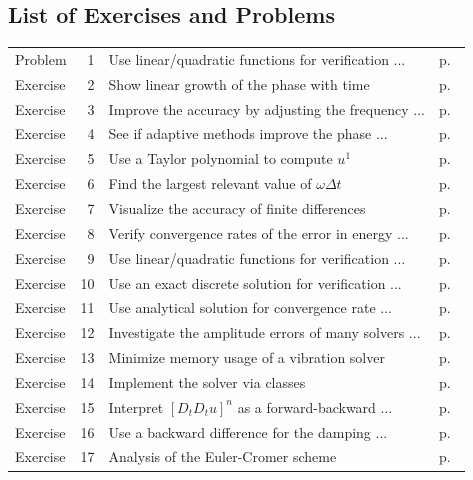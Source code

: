 \documentclass[%
oneside,                 %
final,                   %
10pt]{article}
\begin{document}
\subsection*{List of Exercises and Problems}
\begin{tabular}{lrll}
Problem & 1 & Use linear/quadratic functions for verification ... & p.~\pageref{vib:exer:undamped:verify:linquad} \\
Exercise & 2 & Show linear growth of the phase with time & p.~\pageref{vib:exer:phase:err:growth} \\
Exercise & 3 & Improve the accuracy by adjusting the frequency ... & p.~\pageref{vib:exer:w:adjust} \\
Exercise & 4 & See if adaptive methods improve the phase ... & p.~\pageref{vib:exer:undamped:adaptive} \\
Exercise & 5 & Use a Taylor polynomial to compute $u^1$ & p.~\pageref{vib:exer:step4b:alt} \\
Exercise & 6 & Find the largest relevant value of $\omega\Delta t$ & p.~\pageref{vib:exer:wdt:limit} \\
Exercise & 7 & Visualize the accuracy of finite differences & p.~\pageref{vib:exer:fd:exp:plot} \\
Exercise & 8 & Verify convergence rates of the error in energy ... & p.~\pageref{vib:exer:energy:convrate} \\
Exercise & 9 & Use linear/quadratic functions for verification ... & p.~\pageref{vib:exer:verify:gen:linear} \\
Exercise & 10 & Use an exact discrete solution for verification ... & p.~\pageref{vib:exer:discrete:omega} \\
Exercise & 11 & Use analytical solution for convergence rate ... & p.~\pageref{vib:exer:conv:rate} \\
Exercise & 12 & Investigate the amplitude errors of many solvers ... & p.~\pageref{vib:exer:undamped:odespy} \\
Exercise & 13 & Minimize memory usage of a vibration solver & p.~\pageref{vib:exer:memsave} \\
Exercise & 14 & Implement the solver via classes & p.~\pageref{vib:exer:gen:class} \\
Exercise & 15 & Interpret $[D_tD_t u]^n$ as a forward-backward ... & p.~\pageref{vib:exer:DtDt:asDtpDtm} \\
Exercise & 16 & Use a backward difference for the damping ... & p.~\pageref{vib:exer:quad:damping:bw} \\
Exercise & 17 & Analysis of the Euler-Cromer scheme & p.~\pageref{vib:exer:EulerCromer:analysis} \\

\end{tabular}
\end{document}
